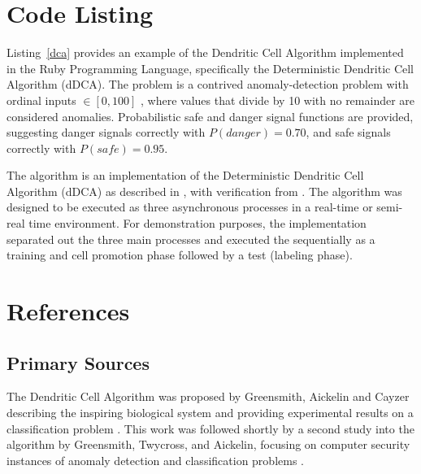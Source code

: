 \documentclass[a4paper, 11pt]{article}
\begin{document}
\section{Code Listing}
\label{sec:code}
Listing~\ref{dca} provides an example of the Dendritic Cell Algorithm implemented in the Ruby Programming Language, specifically the Deterministic Dendritic Cell Algorithm (dDCA).
The problem is a contrived anomaly-detection problem with ordinal inputs $\in [0,100]$ , where values that divide by 10 with no remainder are considered anomalies. Probabilistic safe and danger signal functions are provided, suggesting danger signals correctly with $P(danger)=0.70$, and safe signals correctly with $P(safe)=0.95$.

The algorithm is an implementation of the Deterministic Dendritic Cell Algorithm (dDCA) as described in \cite{Stibor2009, Greensmith2008}, with verification from \cite{Greensmith2006a}. The algorithm was designed to be executed as three asynchronous processes in a real-time or semi-real time environment. For demonstration purposes, the implementation separated out the three main processes and executed the sequentially as a training and cell promotion phase followed by a test (labeling phase).




\section{References}
\label{sec:references}

% 
% 
\subsection{Primary Sources}
The Dendritic Cell Algorithm was proposed by Greensmith, Aickelin and Cayzer describing the inspiring biological system and providing experimental results on a classification problem \cite{Greensmith2005}.
This work was followed shortly by a second study into the algorithm by Greensmith, Twycross, and Aickelin, focusing on computer security instances of anomaly detection and classification problems \cite{Greensmith2006}.
\end{document}
